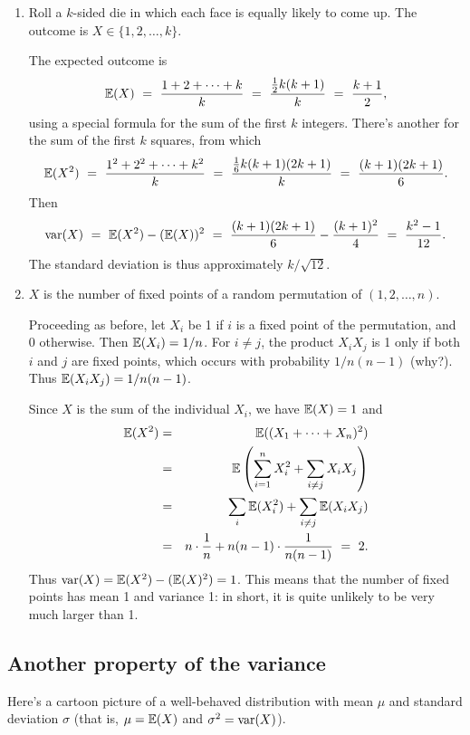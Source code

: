 \begin{enumerate}
\item Roll a $k$-sided die in which each face is equally likely to come up. The outcome
is $X \in \{1,2,\ldots,k\}$.

The expected outcome is
$$
\E(X) 
\ = \ 
\frac{1 + 2 + \cdots + k}{k} 
\ = \ 
\frac{\frac{1}{2} k(k+1)}{k}
\ = \ 
\frac{k+1}{2},
$$
using a special formula for the sum of the first $k$ integers. There's another for
the sum of the first $k$ squares, from which
$$
\E(X^2) 
\ = \ 
\frac{1^2 + 2^2 + \cdots + k^2}{k}
\ = \ 
\frac{\frac{1}{6}k(k+1)(2k+1)}{k}
\ = \ 
\frac{(k+1)(2k+1)}{6}.
$$
Then
$$
\var(X)
\ = \ 
\E(X^2) - (\E(X))^2
\ = \ 
\frac{(k+1)(2k+1)}{6} - \frac{(k+1)^2}{4}
\ = \ 
\frac{k^2 - 1}{12}.
$$
The standard deviation is thus approximately $k/\sqrt{12}$.

\item $X$ is the number of fixed points of a random permutation of $(1,2,\ldots,n)$.

Proceeding as before, let $X_i$ be 1 if $i$ is a fixed point of the permutation, and
0 otherwise. Then $\mathbb{E}(X_i) = 1/n$. For $i \neq j$, the product $X_i X_j$ is 1 only 
if both $i$ and $j$ are fixed points, which occurs with probability $1/n(n-1)$ (why?).
Thus $\mathbb{E}(X_i X_j) = 1/n(n-1)$. 

Since $X$ is the sum of the individual $X_i$, we have $\mathbb{E}(X) = 1$ and
\begin{eqnarray*}
\E(X^2) & = &
\E((X_1 + \cdots + X_n)^2) \\
& = & 
\E \left(\sum_{i=1}^n X_i^2 + \sum_{i \neq j} X_i X_j \right) \\
& = & 
\sum_i \E(X_i^2) + \sum_{i \neq j} \E(X_iX_j) \\
& = & 
n \cdot \frac{1}{n} + n(n-1) \cdot \frac{1}{n(n-1)}
\ = \ 
2.
\end{eqnarray*}
Thus $\mbox{\rm var}(X) = \mathbb{E}(X^2) - (\mathbb{E}(X)^2) = 1$. This means that the number of fixed points
has mean 1 and variance 1: in short, it is quite unlikely to be very much larger than
1.
\end{enumerate}

\subsection{Another property of the variance}

Here's a cartoon picture of a well-behaved distribution with mean $\mu$ and 
standard deviation $\sigma$ (that is, $\mu = \mathbb{E}(X)$ and $\sigma^2 = \mbox{\rm var}(X)$).

\begin{center}
\end{center}

